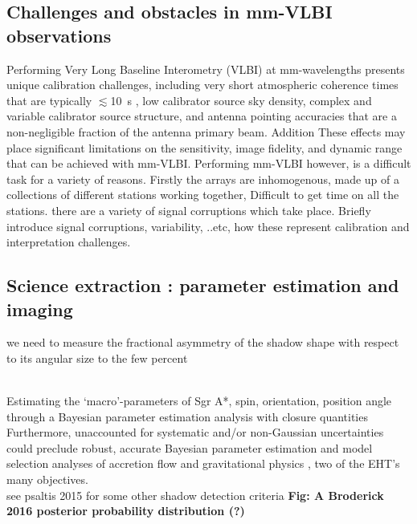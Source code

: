 \subsection{Challenges and obstacles in mm-VLBI observations}
Performing Very Long Baseline Interometry (VLBI) at mm-wavelengths presents unique calibration challenges, including very short atmospheric coherence times that are typically $\lesssim$10~s \citep{Doeleman_2009}, low calibrator source sky density, complex and variable calibrator source structure, and antenna pointing accuracies that are a non-negligible fraction of the antenna primary beam. Addition These effects may place significant limitations on the sensitivity, image fidelity, and dynamic range that can be achieved with mm-VLBI.  Performing mm-VLBI however, is a difficult task for a variety of reasons. Firstly the arrays are inhomogenous, made up of a collections of different stations working together, Difficult to get time on all the stations. there are a variety of signal corruptions which take place. Briefly introduce signal corruptions, variability, ..etc, how these represent calibration and interpretation challenges.


\subsection{Science extraction : parameter estimation and imaging}

we need to measure the fractional
asymmetry of the shadow shape with respect to its angular size to the few percent


~\\
Estimating the `macro'-parameters of Sgr A*, spin, orientation, position angle through a Bayesian parameter estimation analysis with closure quantities\\
Furthermore, unaccounted for systematic and/or non-Gaussian uncertainties could preclude robust, accurate Bayesian parameter estimation and model selection analyses of accretion flow \citep[e.g.][]{Broderick_2016} and gravitational physics \citep[e.g.][]{Broderick_2014, Psaltis_2016}, two of the EHT's many objectives.
~\\
see psaltis 2015 for  some other shadow detection criteria
\textbf{Fig: A Broderick 2016 posterior probability distribution (?)}

